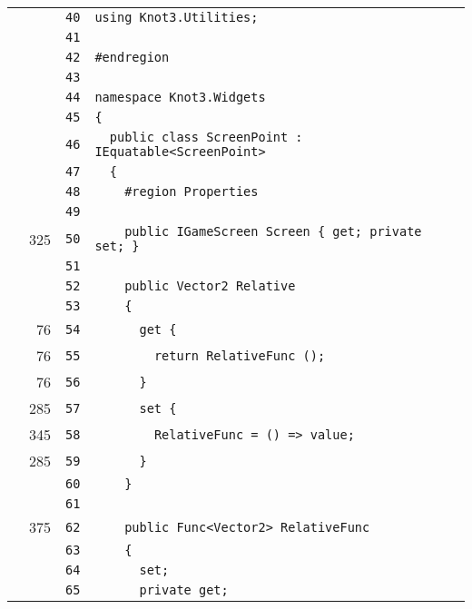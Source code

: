 \documentclass[a4paper,10pt]{article}
\begin{document}
\begin{longtable}[l]{lrrl}
\cellcolor{gray} &  & \verb~40~ & \verb~using Knot3.Utilities;~\\
\cellcolor{gray} &  & \verb~41~ & \verb~~\\
\cellcolor{gray} &  & \verb~42~ & \verb~#endregion~\\
\cellcolor{gray} &  & \verb~43~ & \verb~~\\
\cellcolor{gray} &  & \verb~44~ & \verb~namespace Knot3.Widgets~\\
\cellcolor{gray} &  & \verb~45~ & \verb~{~\\
\cellcolor{gray} &  & \verb~46~ & \verb~  public class ScreenPoint : IEquatable<ScreenPoint>~\\
\cellcolor{gray} &  & \verb~47~ & \verb~  {~\\
\cellcolor{gray} &  & \verb~48~ & \verb~    #region Properties~\\
\cellcolor{gray} &  & \verb~49~ & \verb~~\\
\cellcolor{green} & 325 & \verb~50~ & \verb~    public IGameScreen Screen { get; private set; }~\\
\cellcolor{gray} &  & \verb~51~ & \verb~~\\
\cellcolor{gray} &  & \verb~52~ & \verb~    public Vector2 Relative~\\
\cellcolor{gray} &  & \verb~53~ & \verb~    {~\\
\cellcolor{green} & 76 & \verb~54~ & \verb~      get {~\\
\cellcolor{green} & 76 & \verb~55~ & \verb~        return RelativeFunc ();~\\
\cellcolor{green} & 76 & \verb~56~ & \verb~      }~\\
\cellcolor{green} & 285 & \verb~57~ & \verb~      set {~\\
\cellcolor{green} & 345 & \verb~58~ & \verb~        RelativeFunc = () => value;~\\
\cellcolor{green} & 285 & \verb~59~ & \verb~      }~\\
\cellcolor{gray} &  & \verb~60~ & \verb~    }~\\
\cellcolor{gray} &  & \verb~61~ & \verb~~\\
\cellcolor{green} & 375 & \verb~62~ & \verb~    public Func<Vector2> RelativeFunc~\\
\cellcolor{gray} &  & \verb~63~ & \verb~    {~\\
\cellcolor{gray} &  & \verb~64~ & \verb~      set;~\\
\cellcolor{gray} &  & \verb~65~ & \verb~      private get;~\\

\end{longtable}
\end{document}
